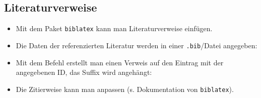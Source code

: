 \subsection{Literaturverweise}

\begin{frame}[fragile]{\subsecname}
    \begin{itemize}
        \item Mit dem Paket \texttt{biblatex} kann man Literaturverweise einfügen.
        \item Die Daten der referenzierten \alert{Literatur} werden in einer \texttt{.bib}\-/Datei
            angegeben:
        \item Mit dem Befehl  erstellt man einen \alert{Verweis} auf
            den Eintrag mit der angegebenen ID, das Suffix wird angehängt:
        \item Die Zitierweise kann man anpassen (s. Dokumentation von \texttt{biblatex}).
    \end{itemize}
\end{frame}
